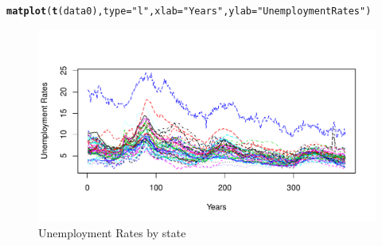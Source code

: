 \documentclass[12pt, leqno]{article}\usepackage[]{graphicx}\usepackage[]{color}
\makeatletter
\def\maxwidth{ %
  \ifdim\Gin@nat@width>\linewidth
    \linewidth
  \else
    \Gin@nat@width
  \fi
}
\newcommand{\hlstr}[1]{\textcolor[rgb]{0.192,0.494,0.8}{#1}}%
\newcommand{\hlstd}[1]{\textcolor[rgb]{0.345,0.345,0.345}{#1}}%
\newcommand{\hlkwc}[1]{\textcolor[rgb]{0.333,0.667,0.333}{#1}}%
\newcommand{\hlkwd}[1]{\textcolor[rgb]{0.737,0.353,0.396}{\textbf{#1}}}%
\newenvironment{kframe}{%
 \def\at@end@of@kframe{}%
 \ifinner\ifhmode%
  \def\at@end@of@kframe{\end{minipage}}%
  \begin{minipage}{\columnwidth}%
 \fi\fi%
 \def\FrameCommand##1{\hskip\@totalleftmargin \hskip-\fboxsep
 \colorbox{shadecolor}{##1}\hskip-\fboxsep
     \hskip-\linewidth \hskip-\@totalleftmargin \hskip\columnwidth}%
 \MakeFramed {\advance\hsize-\width
   \@totalleftmargin\z@ \linewidth\hsize
   \@setminipage}}%
 {\par\unskip\endMakeFramed%
 \at@end@of@kframe}
\newenvironment{knitrout}{}{} %
\makeatother
\begin{document}
\begin{knitrout}
\color{fgcolor}\begin{kframe}
\begin{alltt}
\hlkwd{matplot}\hlstd{(}\hlkwd{t}\hlstd{(data0),}\hlkwc{type} \hlstd{=} \hlstr{"l"}\hlstd{,} \hlkwc{xlab} \hlstd{=} \hlstr{"Years"}\hlstd{,} \hlkwc{ylab} \hlstd{=} \hlstr{"Unemployment Rates"}\hlstd{)}
\end{alltt}
\end{kframe}\begin{figure}[H]
\includegraphics[width=\maxwidth]{figure/p1a-1} \caption[Unemployment Rates by state]{Unemployment Rates by state}\label{fig:p1a}
\end{figure}


\end{knitrout}
\end{document}
